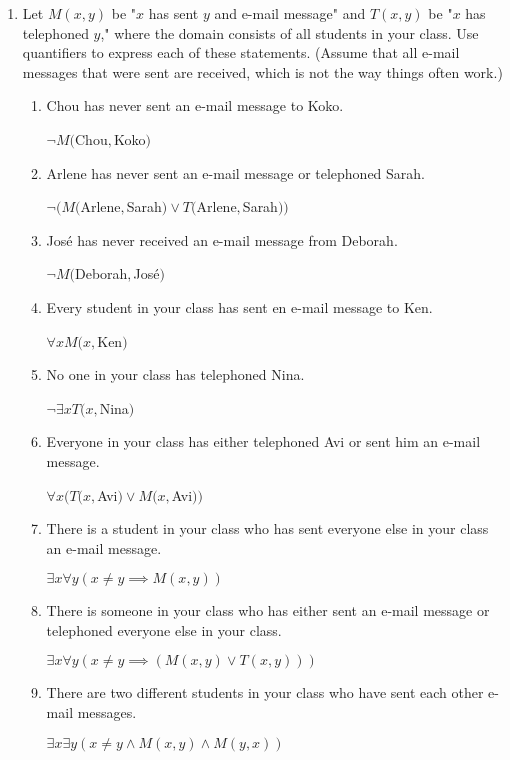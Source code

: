 \documentclass[11pt]{article}
\begin{document}
\begin{enumerate}[label=\textbf{\arabic*.}]
	\item Let $M(x, y)$ be "$x$ has sent $y$ and e-mail message" and $T(x, y)$ be "$x$ has telephoned $y$," where the domain consists of all students in your class. Use quantifiers to express each of these statements. (Assume that all e-mail messages that were sent are received, which is not the way things often work.)
	\begin{enumerate}[label=\textbf{\alph*)}]
		\item Chou has never sent an e-mail message to Koko.
		
		$\neg M($Chou$,$Koko$)$
		
		\item Arlene has never sent an e-mail message or telephoned Sarah.
		
		$\neg(M($Arlene$,$Sarah$) \lor T($Arlene$,$Sarah$))$
		
		\item Jos\'e has never received an e-mail message from Deborah.
		
		$\neg M($Deborah$,$Jos\'e$)$
		
		\item Every student in your class has sent en e-mail message to Ken.
		
		$\forall x M(x,$Ken$)$
		
		\item No one in your class has telephoned Nina.
		
		$\neg\exists x T(x,$Nina$)$
		
		\item Everyone in your class has either telephoned Avi or sent him an e-mail message.
		
		$\forall x(T(x,$Avi$) \lor M(x,$Avi$))$
		
		\item There is a student in your class who has sent everyone else in your class an e-mail message.
		
		$\exists x\forall y(x \ne y \implies M(x,y))$
		
		\item There is someone in your class who has either sent an e-mail message or telephoned everyone else in your class.
		
		$\exists x\forall y(x \ne y \implies (M(x, y) \lor T(x, y)))$
		
		\item There are two different students in your class who have sent each other e-mail messages.
		
		$\exists x\exists y(x \ne y \land M(x, y) \land M(y, x))$
		

\end{enumerate}
\end{enumerate}
\end{document}
